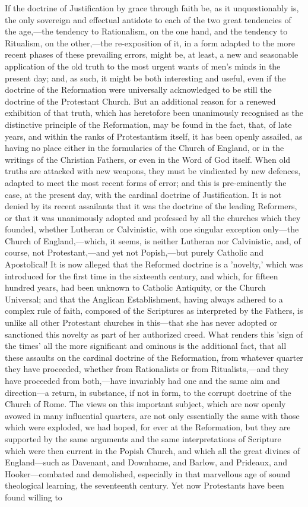 \documentclass[
]{book}
\begin{document}
If the doctrine of Justification by grace through faith be, as it unquestionably is, the only sovereign and effectual antidote to each of the two great tendencies of the age,---the tendency to Rationalism, on the one hand, and the tendency to Ritualism, on the other,---the re-exposition of it, in a form adapted to the more recent phases of these prevailing errors, might be, at least, a new and seasonable application of the old truth to the most urgent wants of men's minds in the present day; and, as such, it might be both interesting and useful, even if the doctrine of the Reformation were universally acknowledged to be still the doctrine of the Protestant Church. But an additional reason for a renewed exhibition of that truth, which has heretofore been unanimously recognised as the distinctive principle of the Reformation, may be found in the fact, that, of late years, and within the ranks of Protestantism itself, it has been openly assailed, as having no place either in the formularies of the Church of England, or in the writings of the Christian Fathers, or even in the Word of God itself. When old truths are attacked with new weapons, they must be vindicated by new defences, adapted to meet the most recent forms of error; and this is pre-eminently the case, at the present day, with the cardinal doctrine of Justification. It is not denied by its recent assailants that it was the doctrine of the leading Reformers, or that it was unanimously adopted and professed by all the churches which they founded, whether Lutheran or Calvinistic, with one singular exception only---the Church of England,---which, it seems, is neither Lutheran nor Calvinistic, and, of course, not Protestant,---and yet not Popish,---but purely Catholic and Apostolical! It is now alleged that the Reformed doctrine is a 'novelty,' which was introduced for the first time in the sixteenth century, and which, for fifteen hundred years, had been unknown to Catholic Antiquity, or the Church Universal; and that the Anglican Establishment, having always adhered to a complex rule of faith, composed of the Scriptures as interpreted by the Fathers, is unlike all other Protestant churches in this---that she has never adopted or sanctioned this novelty as part of her authorized creed. What renders this 'sign of the times' all the more significant and ominous is the additional fact, that all these assaults on the cardinal doctrine of the Reformation, from whatever quarter they have proceeded, whether from Rationalists or from Ritualists,---and they have proceeded from both,---have invariably had one and the same aim and direction---a return, in substance, if not in form, to the corrupt doctrine of the Church of Rome. The views on this important subject, which are now openly avowed in many influential quarters, are not only essentially the same with those which were exploded, we had hoped, for ever at the Reformation, but they are supported by the same arguments and the same interpretations of Scripture which were then current in the Popish Church, and which all the great divines of England---such as Davenant, and Downhame, and Barlow, and Prideaux, and Hooker---combated and demolished, especially in that marvellous age of sound theological learning, the seventeenth century. Yet now Protestants have been found willing to 
\end{document}
